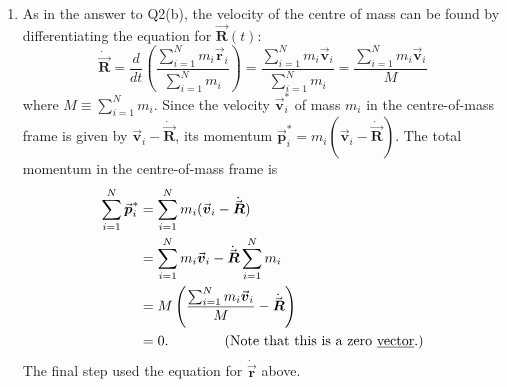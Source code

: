 \documentclass[12pt]{article}
\begin{document}
\begin{enumerate}
\item As in the answer to Q2(b), the velocity of the centre of mass can
  be found by differentiating the equation for $\vec{\boldsymbol{R}}(t)$:
  \begin{displaymath}
    \dot{\vec{\boldsymbol{R}}} = \frac{d}{dt} \left (
      \frac{\sum_{i=1}^{N} m_i \vec{\boldsymbol{r}}_i}{\sum_{i=1}^{N} m_i}
    \right ) = \frac{\sum_{i=1}^{N} m_i \vec{\boldsymbol{v}}_i}{\sum_{i=1}^{N} m_i}
    = \frac{\sum_{i=1}^{N} m_i \vec{\boldsymbol{v}}_i}{M}
  \end{displaymath}
  where $M \equiv \sum_{i=1}^{N} m_i$. Since the velocity
  $\vec{\boldsymbol{v}}_i^{\ast}$ of mass $m_i$ in the centre-of-mass frame is given by
  $\vec{\boldsymbol{v}}_i - \dot{\vec{\boldsymbol{R}}}$, its momentum
  $\vec{\boldsymbol{p}}_i^{\ast} = m_i(\vec{\boldsymbol{v}}_i - \dot{\vec{\boldsymbol{R}}})$. The total momentum in the
  centre-of-mass frame is
  \begin{align*}
    \sum_{i=1}^{N} \vec{\boldsymbol{p}}_i^{\ast}
    &=  \sum_{i=1}^{N} m_i (\vec{\boldsymbol{v}}_i - \dot{\vec{\boldsymbol{R}}} ) \\
    &= \sum_{i=1}^{N} m_i \vec{\boldsymbol{v}}_i - \dot{\vec{\boldsymbol{R}}} \sum_{i=1}^{N} m_i \\
    &= M \left ( \frac{\sum_{i=1}^{N} m_i \vec{\boldsymbol{v}}_i}{M} - \dot{\vec{\boldsymbol{R}}}
      \right ) \\
    &= 0. \qquad\qquad
      \text{(Note that this is a zero \underline{vector}.)}
  \end{align*}
  The final step used the equation for $\dot{\vec{\boldsymbol{r}}}$ above.


\end{enumerate}
\end{document}
